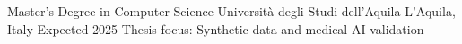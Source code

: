 
\cventry
  {Master's Degree in Computer Science}
  {Università degli Studi dell'Aquila}
  {L'Aquila, Italy}
  {Expected 2025}
  {}
  {Thesis focus: Synthetic data and medical AI validation}